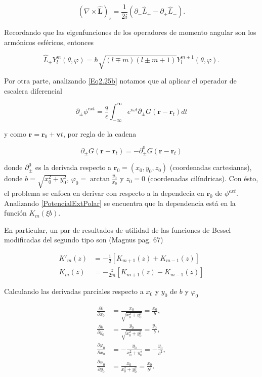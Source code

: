 \documentclass[a4paper,10pt]{article}
\newcommand{\hatbf}[1] {\hat{\mathbf{#1}}}	%
\begin{document}
\begin{equation}
(\nabla\times\hatbf{L})_z=\frac{1}{2i}(\partial_-\hat{L}_+-\partial_+\hat{L}_-).
\end{equation}

Recordando que las eigenfunciones de los operadores de momento angular son los armónicos esféricos, entonces

\begin{equation}
\hat{L}_{\pm}Y_l^m(\theta,\varphi)=\hbar\sqrt{(l\mp m)(l\pm m+1)} Y_l^{m\pm 1}(\theta,\varphi).
\label{Eq3.21}
\end{equation}

Por otra parte, analizando \eqref{Eq2.25b} notamos que al aplicar el operador de escalera diferencial

\begin{equation}
\partial_{\pm}\phi^{ext}=\frac{q}{\epsilon}\int_{-\infty}^{\infty} e^{i\omega t}\partial_{\pm}G(\textbf{r}-\textbf{r}_t)dt
\end{equation}

y como $\textbf{r}=\textbf{r}_0+\textbf{v}t$, por regla de la cadena

\begin{equation}
\partial_{\pm}G(\textbf{r}-\textbf{r}_t)=-\partial^0_{\pm}G(\textbf{r}-\textbf{r}_t)
\end{equation}

donde $\partial_{\pm}^0$ es la derivada respecto a $\textbf{r}_0=(x_0,y_0,z_0)$ (coordenadas cartesianas), donde $b=\sqrt{x_0^2+y_0^2}$, $\varphi_0=\arctan\frac{y_0}{x_0}$ y $z_0=0$ (coordenadas cilíndricas). Con ésto, el problema se enfoca en derivar con respecto a la dependecia en $\textbf{r}_0$ de $\phi^{ext}$. Analizando \eqref{PotencialExtPolar} se encuentra que la dependencia está en la función $K_m(\xi b)$. 

En particular, un par de resultados de utilidad de las funciones de Bessel modificadas del segundo tipo son (Magnus pag. 67) 

\begin{subequations}
\begin{align}
K'_m(z)	&=-\frac{1}{2}[K_{m+1}(z)+K_{m-1}(z)]	\\
K_m(z)	&=-\frac{z}{2m}[K_{m+1}(z)-K_{m-1}(z)]
\end{align}
\label{Eq3.24}
\end{subequations}

Calculando las derivadas parciales respecto a $x_0$ y $y_0$ de $b$ y $\varphi_0$

\begin{subequations}
\begin{align}
\frac{\partial b}{\partial x_0}	&=	\frac{x_0}{\sqrt{x_0^2+y_0^2}}=\frac{x_0}{b},	\\
\frac{\partial b}{\partial y_0}	&=	\frac{y_0}{\sqrt{x_0^2+y_0^2}}=\frac{y_0}{b},	\\
\frac{\partial \varphi_0}{\partial x_0}	&= -\frac{y_0}{x_0^2+y_0^2}=-\frac{y_0}{b^2},	\\
\frac{\partial \varphi_0}{\partial y_0}	&= \frac{x_0}{x_0^2+y_0^2}=\frac{x_0}{b^2}.
\end{align}
\label{Eq3.25}
\end{subequations}
\end{document}
